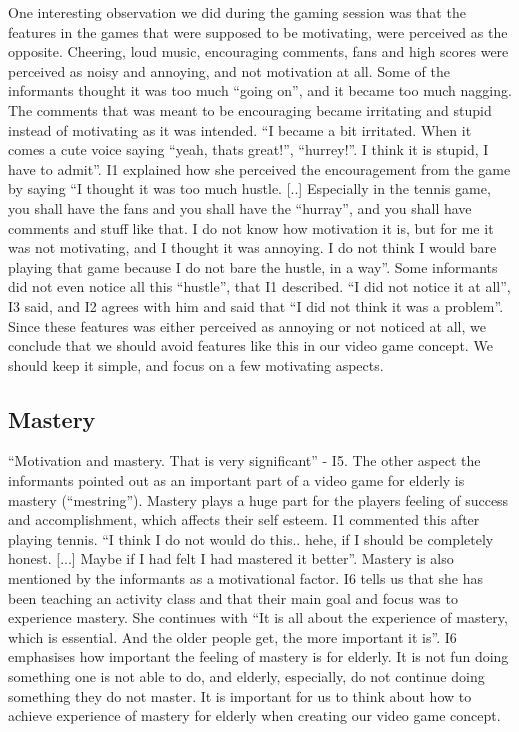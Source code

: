 One interesting observation we did during the gaming session was that the features in the games that were supposed to be motivating, were perceived as the opposite. Cheering, loud music, encouraging comments, fans and high scores were perceived as noisy and annoying, and not motivation at all. Some of the informants thought it was too much “going on”, and it became too much nagging. The comments that was meant to be encouraging became irritating and stupid instead of motivating as it was intended. “I became a bit irritated. When it comes a cute voice saying “yeah, thats great!”, “hurrey!”. I think it is stupid, I have to admit”.  I1 explained how she perceived the encouragement from the game by saying “I thought it was too much hustle. [..] Especially in the tennis game, you shall have the fans and you shall have the “hurray”, and you shall have comments and stuff like that. I do not know how motivation it is, but for me it was not motivating, and I thought it was annoying. I do not think I would bare playing that game because I do not bare the hustle, in a way”. Some informants did not even notice all this “hustle”, that I1 described. “I did not notice it at all”, I3 said, and I2 agrees with him and said that “I did not think it was a problem”. Since these features was either perceived as annoying or not noticed at all, we conclude that we should avoid features like this in our video game concept. We should keep it simple, and focus on a few motivating aspects. 

\subsection{Mastery}
“Motivation and mastery. That is very significant” - I5. The other aspect the informants pointed out as an important part of a video game for elderly is mastery (“mestring”). Mastery plays a huge part for the players feeling of success and accomplishment, which affects their self esteem. I1 commented this after playing tennis. “I think I do not would do this.. hehe, if I should be completely honest. [...] Maybe if I had felt I had mastered it better”. Mastery is also mentioned by the informants as a motivational factor. I6 tells us that she has been teaching an activity class and that their main goal and focus was to experience mastery. She continues with “It is all about the experience of mastery, which is essential. And the older people get, the more important it is”. I6 emphasises how important the feeling of mastery is for elderly. It is not fun doing something one is not able to do, and elderly, especially, do not continue doing something they do not master. It is important for us to think about how to achieve experience of mastery for elderly when creating our video game concept. 

